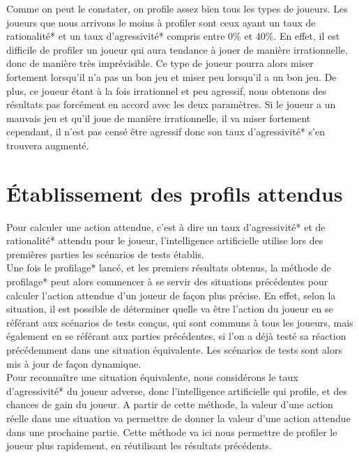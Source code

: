 \documentclass{report}
\begin{document}
Comme on peut le constater, on profile assez bien tous les types de joueurs. Les joueurs que nous arrivons le moins à profiler sont ceux ayant un taux de rationalité* et un taux d'agressivité* compris entre 0\% et 40\%. En effet, il est difficile de profiler un joueur qui aura tendance à jouer de manière irrationnelle, donc de manière très imprévisible. Ce type de joueur pourra alors miser fortement lorsqu'il n'a pas un bon jeu et miser peu lorsqu'il a un bon jeu. De plus, ce joueur étant à la fois irrationnel et peu agressif, nous obtenons des résultats pas forcément en accord avec les deux paramètres. Si le joueur a un mauvais jeu et qu'il joue de manière irrationnelle, il va miser fortement cependant, il n'est pas censé être agressif donc son taux d'agressivité* s'en trouvera augmenté.


\section{Établissement des profils attendus}

\hspace{0.5cm}Pour calculer une action attendue, c'est à dire un taux d'agressivité* et de rationalité* attendu pour le joueur, l'intelligence artificielle utilise lors des premières parties les scénarios de tests établis.\\

Une fois le profilage* lancé, et les premiers résultats obtenus, la méthode de profilage* peut alors commencer à se servir des situations précédentes pour calculer l'action attendue d'un joueur de façon plus précise. En effet, selon la situation, il est possible de déterminer quelle va être l'action du joueur en se référant aux scénarios de tests conçus, qui sont communs à tous les joueurs, mais également en se référant aux parties précédentes, si l'on a déjà testé sa réaction précédemment dans une situation équivalente. Les scénarios de tests sont alors mis à jour de façon dynamique.\\

Pour reconnaître une situation équivalente, nous considérons le taux d'agressivité* du joueur adverse, donc l'intelligence artificielle qui profile, et des chances de gain du joueur. A partir de cette méthode, la valeur d'une action réelle dans une situation va permettre de donner la valeur d'une action attendue dans une prochaine partie. Cette méthode va ici nous permettre de profiler le joueur plus rapidement, en réutilisant les résultats précédents.\\
\end{document}

